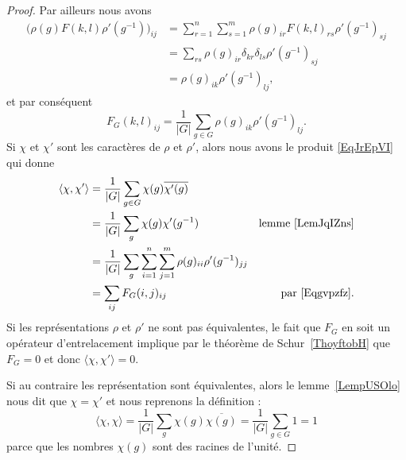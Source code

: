\begin{proof}
    Par ailleurs nous avons
    \begin{subequations}
        \begin{align}
            \Big( \rho(g)F(k,l)\rho'(g^{-1}) \Big)_{ij}&=\sum_{r=1}^n\sum_{s=1}^m\rho(g)_{ir}F(k,l)_{rs}\rho'(g^{-1})_{sj}\\
            &=\sum_{rs}\rho(g)_{ir}\delta_{kr}\delta_{ls}\rho'(g^{-1})_{sj}\\
            &=\rho(g)_{ik}\rho'(g^{-1})_{lj},
        \end{align}
    \end{subequations}
    et par conséquent
    \begin{equation}    \label{Eqgvpzfz}
        F_G(k,l)_{ij}=\frac{1}{ | G | }\sum_{g\in G}\rho(g)_{ik}\rho'(g^{-1})_{lj}.
    \end{equation}
    Si \( \chi\) et \( \chi'\) sont les caractères de \( \rho\) et \( \rho'\), alors nous avons le produit \eqref{EqJrEpVI} qui donne
    \begin{subequations}
        \begin{align}
            \langle \chi, \chi'\rangle &=\frac{1}{ | G | }\sum_{g\in G}\chi(g)\overline{ \chi'(g) }\\
            &=\frac{1}{ | G | }\sum_g\chi(g)\chi'(g^{-1})    &\text{lemme~\ref{LemJqIZns}}\\
            &=\frac{1}{ | G | }\sum_g\sum_{i=1}^n\sum_{j=1}^m\rho(g)_{ii}\rho'(g^{-1})_{jj}     \label{sEqKYywTM}\\
            &=\sum_{ij}F_G(i,j)_{ij}    &\text{par \eqref{Eqgvpzfz}}.
        \end{align}
    \end{subequations}
    Si les représentations \( \rho\) et \( \rho'\) ne sont pas équivalentes, le fait que \( F_G\) en soit un opérateur d'entrelacement implique par le théorème de Schur~\ref{ThoyftobH} que \( F_G=0\) et donc \( \langle \chi, \chi'\rangle =0\).

    Si au contraire les représentation sont équivalentes, alors le lemme~\ref{LempUSOlo} nous dit que \( \chi=\chi'\) et nous reprenons la définition :
    \begin{equation}
        \langle \chi, \chi\rangle =\frac{1}{ | G | }\sum_g\chi(g)\overline{ \chi(g) }=\frac{1}{ | G | }\sum_{g\in G}1=1
    \end{equation}
    parce que les nombres \( \chi(g)\) sont des racines de l'unité.
\end{proof}



